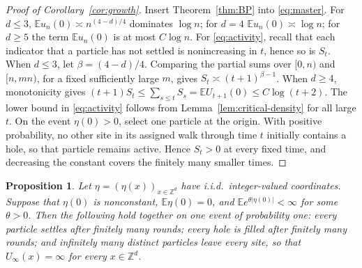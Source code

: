 \documentclass[11pt]{amsart}
\theoremstyle{plain}
\newtheorem{proposition}[theorem]{Proposition}
\theoremstyle{definition}
\newcommand{\Z}{\mathbb{Z}}
\newcommand{\E}{\mathbb{E}}
\begin{document}
\begin{proof}[Proof of Corollary~\ref{cor:growth}]
	Insert Theorem~\ref{thm:BP} into \eqref{eq:master}. For $d\leq3$,
	$\E u_n(0)\asymp n^{(4-d)/4}$ dominates
	$\log n$; for $d=4$ $\E u_n(0)\asymp\log n$; for $d\geq5$ the
	term $\E u_n(0)$ is at most $C\log n$. For \eqref{eq:activity}, recall that each
	indicator that a particle has not settled is nonincreasing in $t$, hence so
	is $S_t$.
	When $d\leq3$, let $\beta=(4-d)/4$. Comparing the partial sums over
	$[0,n)$ and $[n,mn)$, for a fixed sufficiently large $m$, gives
	$S_t\asymp(t+1)^{\beta-1}$. When $d\geq4$, monotonicity gives
	$(t+1)S_t\leq\sum_{s\leq t}S_s=\E U_{t+1}(0)\leq C\log(t+2)$. The lower
	bound in \eqref{eq:activity} follows from Lemma~\ref{lem:critical-density} for
	all large $t$.
	On the event $\eta(0)>0$, select one particle at the origin. With positive
	probability, no other site in its assigned walk through time $t$ initially
	contains a hole, so that particle remains active. Hence $S_t>0$ at every
	fixed time, and decreasing the constant covers the finitely many smaller
	times.
\end{proof}

\begin{proposition}\label{prop:everyone-settles}
	Let $\eta=(\eta(x))_{x\in\Z^d}$ have i.i.d.\ integer-valued coordinates.
	Suppose that $\eta(0)$ is nonconstant, $\E\eta(0)=0$, and
	$\E e^{\theta|\eta(0)|}<\infty$ for some $\theta>0$. Then the following hold
	together on one event of probability one: every particle settles after
	finitely many rounds; every hole is filled after finitely many rounds; and
	infinitely many distinct particles leave every site, so that
	$U_\infty(x)=\infty$ for every $x\in\Z^d$.
\end{proposition}
\end{document}

